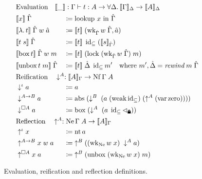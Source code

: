 \documentclass{article}
\newcommand{\lock}{
  \text{\tikz[baseline]{
      \fill[rounded corners=.1ex] (-.75ex,0) rectangle (.75ex,1ex);
      \draw[line width=.3ex] (-.4ex,.5ex) -- ++(0,.75ex) arc (180:0:.4ex) -- ++(0,-.75ex);
}}}
\begin{document}
\begin{figure}
  \centering
  \begin{align*}
    &\mathrlap{\text{Evaluation} \quad \llbracket\_\rrbracket : \Gamma \vdash t : A \rightarrow \forall\Delta. \, \llbracket\Gamma\rrbracket_\Delta \rightarrow \llbracket A \rrbracket_\Delta} &&\\
    &\llbracket x \rrbracket \; \hat\Gamma &&\coloneqq \text{lookup } x \text{ in } \hat\Gamma \\
    &\llbracket \lambda. \, t \rrbracket \; \hat\Gamma \; w \; \hat a &&\coloneqq \llbracket t \rrbracket \; (\operatorname{wk}_{\hat\Gamma} w \; \hat\Gamma, \hat a) \\
    &\llbracket t \; s \rrbracket \; \hat\Gamma &&\coloneqq \llbracket t \rrbracket \; \operatorname{id}_\subseteq \; (\llbracket s \rrbracket_{\hat\Gamma}) \\
    &\llbracket \operatorname{box} t \rrbracket \; \hat\Gamma \; w \; m &&\coloneqq \llbracket t \rrbracket \; (\operatorname{lock} \; (\operatorname{wk}_{\hat\Gamma} w \; \hat\Gamma) \; m) \\
    &\llbracket \operatorname{unbox} t \; m \rrbracket \; \hat\Gamma &&\coloneqq \llbracket t \rrbracket \; \hat\Delta \; \operatorname{id}_\subseteq m' \quad \text{where } m' , \hat\Delta = \textit{rewind} \; m \; \hat\Gamma \\
    &\mathrlap{\text{Reification} \quad \downarrow^A : \llbracket A \rrbracket_\Gamma \rightarrow \operatorname{Nf} \Gamma \; A} &&\\
    &\downarrow^\iota a &&\coloneqq a \\
    &\downarrow^{A \rightarrow B} a &&\coloneqq \operatorname{abs} \; (\downarrow^B \; (a \; (\operatorname{weak} \operatorname{id}_\subseteq) \; (\uparrow^A (\operatorname{var} \operatorname{zero})))) \\
    &\downarrow^{\Box A} a &&\coloneqq \operatorname{box} \; (\downarrow^A \; (a \; \operatorname{id}_\subseteq \lhd_\lock)) \\
    &\mathrlap{\text{Reflection} \quad \uparrow^A : \operatorname{Ne} \Gamma \; A \rightarrow \llbracket A \rrbracket_\Gamma} &&\\
    &\uparrow^\iota x &&\coloneqq \operatorname{nt} a \\
    &\uparrow^{A \rightarrow B} x \; w \; a &&\coloneqq \; \uparrow^B ((\operatorname{wk}_{\operatorname{Ne}} w \; x) \; \downarrow^A a) \\
    &\uparrow^{\Box A} x \; a &&\coloneqq \; \uparrow^B (\operatorname{unbox} \; (\operatorname{wk}_{\operatorname{Ne}} w \; x) \; m)
  \end{align*}
  \caption{Evaluation, reification and reflection definitions. \label{fig:nbe}}
\end{figure}
\end{document}
